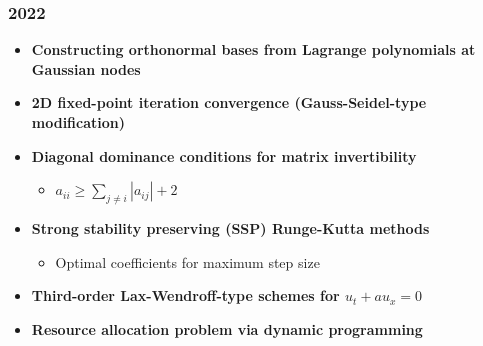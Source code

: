 \subsubsection*{2022}
\begin{itemize}
    \item \textbf{Constructing orthonormal bases from Lagrange polynomials at Gaussian nodes}
    \item \textbf{2D fixed-point iteration convergence (Gauss-Seidel-type modification)}
    \item \textbf{Diagonal dominance conditions for matrix invertibility}
        \begin{itemize}
            \item $a_{ii} \geq \sum_{j\neq i}|a_{ij}| + 2$
        \end{itemize}
    \item \textbf{Strong stability preserving (SSP) Runge-Kutta methods}
        \begin{itemize}
            \item Optimal coefficients for maximum step size
        \end{itemize}
    \item \textbf{Third-order Lax-Wendroff-type schemes for $u_t + au_x = 0$}
    \item \textbf{Resource allocation problem via dynamic programming}
\end{itemize}

